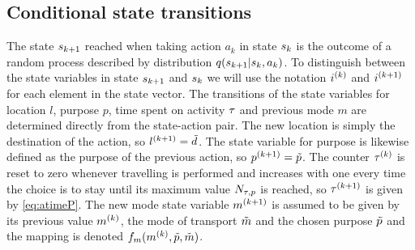 \subsection{Conditional state transitions}
The state $s_{k+1}$ reached when taking action $a_k$ in state $s_{k}$ is the outcome of a random process described by distribution $q(s_{k+1}|s_{k},a_k)$. To distinguish between the state variables in state $s_{k+1}$ and $s_{k}$ we will use the notation $i^{(k)}$ and $i^{(k+1)}$ for each element in the state vector.
The transitions of the state variables for location $l$, purpose $p$, time spent on activity $\tau$ and previous mode $m$ are determined directly from the state-action pair. The new location is simply the destination of the action, so $l^{(k+1)} = \tilde{d}$. The state variable for purpose is likewise defined as the purpose of the previous action, so $p^{(k+1)} = \tilde{p}$. 
The counter $\tau^{(k)}$ is reset to zero whenever travelling is performed and increases with one every time the choice is to stay until its maximum value $N_{\tau,p}$ is reached, so $\tau^{(k+1)}$ is given by \eqref{eq:atimeP}.
The new mode state variable $m^{(k+1)}$ is assumed to be given by its previous value $m^{(k)}$, the mode of transport $\tilde{m}$ and the chosen purpose $\tilde{p}$ and the mapping is denoted $f_m(m^{(k)},\tilde{p},\tilde{m})$.

